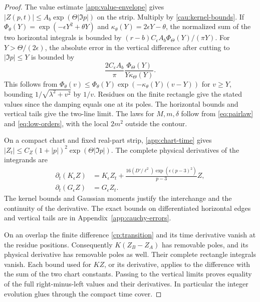 \begin{proof}
The value estimate \eqref{app:value-envelope} gives
\(|Z(p,t)|\le A_b\exp(\Theta|\Im p|)\) on the strip. Multiply by
\eqref{cau:kernel-bounds}. If
\(\Phi_\theta(Y)=\exp(-\epsilon Y^2+\theta Y)\) and
\(\kappa_\theta(Y)=2\epsilon Y-\theta\), the normalized sum of the
two horizontal integrals is bounded by
\((r-b)C_\epsilon A_b\Phi_\Theta(Y)/(\pi Y)\).
For \(Y>\Theta/(2\epsilon)\), the absolute error in the vertical
difference after cutting to \(|\Im p|\le Y\) is bounded by
\begin{equation}
 \frac{2C_\epsilon A_b}{\pi}
            \frac{\Phi_\Theta(Y)}{Y\kappa_\Theta(Y)}.
 \label{eq:vertical-tail}
\end{equation}
This follows from
\(\Phi_\theta(v)\le\Phi_\theta(Y)
\exp(-\kappa_\theta(Y)(v-Y))\) for \(v\ge Y\), bounding
\(1/\sqrt{\lambda^2+v^2}\) by \(1/v\).
Residues on the finite rectangle give the stated values since
the damping equals one at its poles. The horizontal bounds and
vertical tails give the two-line limit. The laws for \(M,m,\delta\)
follow from \eqref{eq:pairlaw} and \eqref{eq:low-orders}, with the
local \(2m^2\) outside the contour.

On a compact chart and fixed real-part strip,
\eqref{app:chart-time} gives
\(|Z_t|\le C_Z(1+|p|)^2\exp(\Theta|\Im p|)\).
The complete physical derivatives of the integrands are
\begin{equation}
 \begin{aligned}
 \partial_t(K_\epsilon Z)&=K_\epsilon Z_t+
          \frac{16(D'/\ell^2)\exp(\epsilon(p-3)^2)}{p-3}Z,\\
 \partial_t(G_\epsilon Z)&=G_\epsilon Z_t .
 \end{aligned}
 \label{cau:kernel-time}
\end{equation}
The kernel bounds and Gaussian moments justify the interchange
and the continuity of the derivative. The exact bounds on
differentiated horizontal edges and vertical tails are in
Appendix~\ref{app:cauchy-errors}.

On an overlap the finite difference \eqref{cp:transition} and
its time derivative vanish at the residue positions.
Consequently \(K(Z_B-Z_A)\) has removable poles, and its
physical derivative has removable poles as well. Their complete
rectangle integrals vanish. Each bound used for \(KZ\), or
its derivative, applies to the difference with the sum of the two
chart constants. Passing to the vertical limits proves equality
of the full right-minus-left values and their derivatives. In
particular the integer evolution glues through the compact time
cover.
\end{proof}

